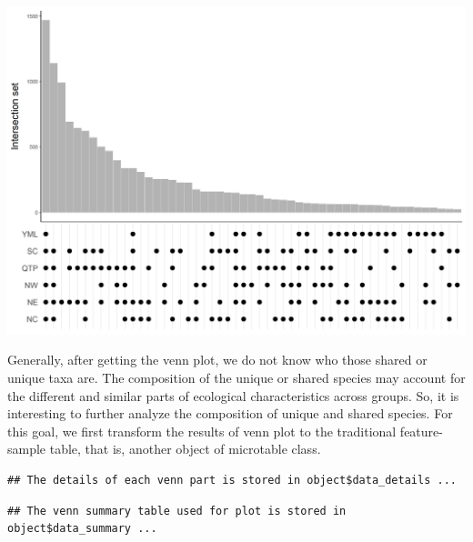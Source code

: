 \documentclass[
]{book}
\newenvironment{Shaded}{\begin{snugshade}}{\end{snugshade}}
\newcommand{\AttributeTok}[1]{\textcolor[rgb]{0.77,0.63,0.00}{#1}}
\newcommand{\FunctionTok}[1]{\textcolor[rgb]{0.00,0.00,0.00}{#1}}
\newcommand{\NormalTok}[1]{#1}
\newcommand{\OtherTok}[1]{\textcolor[rgb]{0.56,0.35,0.01}{#1}}
\newcommand{\SpecialCharTok}[1]{\textcolor[rgb]{0.00,0.00,0.00}{#1}}
\newcommand{\StringTok}[1]{\textcolor[rgb]{0.31,0.60,0.02}{#1}}
\begin{document}
\begin{center}\includegraphics[width=800px]{Images/plot_venn_bar_type} \end{center}

Generally, after getting the venn plot, we do not know who those shared or unique taxa are.
The composition of the unique or shared species may account for the different and similar parts of ecological characteristics across groups\citep{Mendes_Deciphering_2011}.
So, it is interesting to further analyze the composition of unique and shared species.
For this goal, we first transform the results of venn plot to the traditional feature-sample table, that is, another object of microtable class.

\begin{Shaded}
\end{Shaded}

\begin{verbatim}
## The details of each venn part is stored in object$data_details ...
\end{verbatim}

\begin{verbatim}
## The venn summary table used for plot is stored in object$data_summary ...
\end{verbatim}
\end{document}
